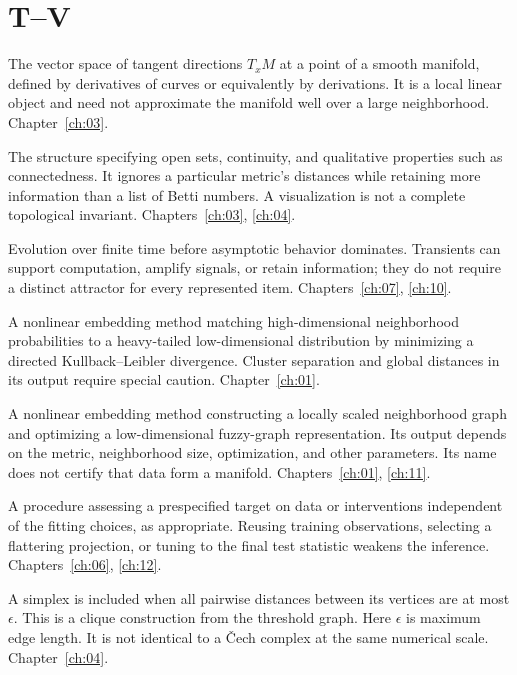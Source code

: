 \section*{T--V}
\begin{description}[style=nextline]
\item[Tangent space.] The vector space of tangent directions $T_xM$ at a point of a smooth manifold, defined by derivatives of curves or equivalently by derivations. It is a local linear object and need not approximate the manifold well over a large neighborhood. Chapter~\ref{ch:03}.
\item[Topology.] The structure specifying open sets, continuity, and qualitative properties such as connectedness. It ignores a particular metric's distances while retaining more information than a list of Betti numbers. A visualization is not a complete topological invariant. Chapters~\ref{ch:03}, \ref{ch:04}.
\item[Transient dynamics.] Evolution over finite time before asymptotic behavior dominates. Transients can support computation, amplify signals, or retain information; they do not require a distinct attractor for every represented item. Chapters~\ref{ch:07}, \ref{ch:10}.
\item[t-SNE.] A nonlinear embedding method matching high-dimensional neighborhood probabilities to a heavy-tailed low-dimensional distribution by minimizing a directed Kullback--Leibler divergence. Cluster separation and global distances in its output require special caution. Chapter~\ref{ch:01}.
\item[UMAP.] A nonlinear embedding method constructing a locally scaled neighborhood graph and optimizing a low-dimensional fuzzy-graph representation. Its output depends on the metric, neighborhood size, optimization, and other parameters. Its name does not certify that data form a manifold. Chapters~\ref{ch:01}, \ref{ch:11}.
\item[Validation.] A procedure assessing a prespecified target on data or interventions independent of the fitting choices, as appropriate. Reusing training observations, selecting a flattering projection, or tuning to the final test statistic weakens the inference. Chapters~\ref{ch:06}, \ref{ch:12}.
\item[Vietoris--Rips complex.] A simplex is included when all pairwise distances between its vertices are at most $\epsilon$. This is a clique construction from the threshold graph. Here $\epsilon$ is maximum edge length. It is not identical to a \v{C}ech complex at the same numerical scale. Chapter~\ref{ch:04}.
\end{description}
